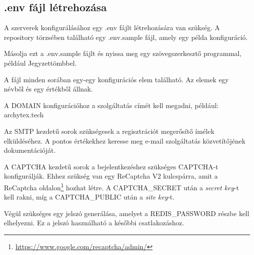 \subsection{.env fájl létrehozása}
\label{config}

A szerverek konfigurálásához egy .env fájlt létrehozására van szükség. A repository törzsében található egy .env.sample fájl, amely egy példa konfiguráció.

Másolja ezt a .env.sample fájlt és nyissa meg egy szövegszerkesztő programmal, például Jegyzettömbbel.

A fájl minden sorában egy-egy konfigurációs elem található. Az elemek egy névből és egy értékből állnak.

A DOMAIN konfigurációhoz a szolgáltatás címét kell megadni, például: archytex.tech

Az SMTP kezdetű sorok szükségesek a regisztrációt megerősítő ímélek elküldéséhez. A pontos értékekhez keresse meg e-mail szolgáltatás közvetítőjének dokumentációját.

A CAPTCHA kezdetű sorok a bejelentkezéshez szükséges CAPTCHA-t konfigurálják. Ehhez szükség van egy ReCaptcha V2 kulcspárra, amit a ReCaptcha oldalon\footnote{\url{https://www.google.com/recaptcha/admin/}} hozhat létre. A CAPTCHA\_SECRET után a \emph{secret key}-t kell rakni, míg a CAPTCHA\_PUBLIC után a \emph{site key}-t.

Végül szükséges egy jelszó generálása, amelyet a REDIS\_PASSWORD részbe kell elhelyezni. Ez a jelszó használható a későbbi csatlakozáshoz.